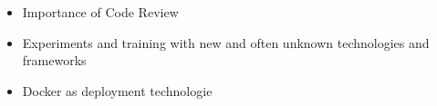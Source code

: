 \documentclass[20pt, a1paper]{tikzposter}
\begin{document}
	\begin{columns}	
		{
			\begin{itemize}
				\item Importance of Code Review
				\item Experiments and training with new and often unknown technologies and frameworks
				\item Docker as deployment technologie
			\end{itemize}
		}
		{
			
			
		}
	\end{columns}

	

	
\end{document}
